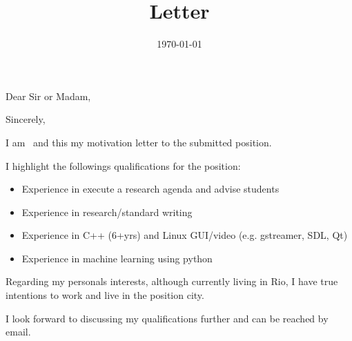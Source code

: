 \documentclass[10pt,a4paper,sans,colorlinks]{moderncv}
\title{Letter}
\newcommand\jobmotivation{
  I highlight the followings qualifications for the position:
  \begin{itemize}[mynosep]
    \item Experience in execute a research agenda and advise students
    \item Experience in research/standard writing
    \item Experience in C++ (6+yrs) and Linux GUI/video (e.g. gstreamer, SDL, Qt)
    \item Experience in machine learning using python
  \end{itemize}

  Regarding my personals interests, although currently living in Rio, I have true intentions to work and live in the position city.
}
\begin{document}
\hfHyperrefSetupBlueLinks

\recipient{\ }{}
\opening{Dear Sir or Madam,}
\date{\today}
\closing{Sincerely,}

\makelettertitle

\justify
I am \myname~and this my motivation letter to the submitted position.


\jobmotivation

I look forward to discussing my qualifications further and can be reached by email.

\makeletterclosing
\end{document}
